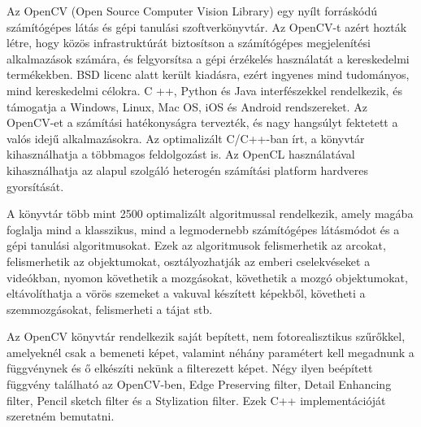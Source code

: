 


Az OpenCV (Open Source Computer Vision Library) egy nyílt forráskódú számítógépes látás és gépi tanulási szoftverkönyvtár. Az OpenCV-t azért hozták létre, hogy közös infrastruktúrát biztosítson a számítógépes megjelenítési alkalmazások számára, és felgyorsítsa a gépi érzékelés használatát a kereskedelmi termékekben. BSD licenc alatt került kiadásra, ezért ingyenes mind tudományos, mind kereskedelmi célokra. C ++, Python és Java interfészekkel rendelkezik, és támogatja a Windows, Linux, Mac OS, iOS és Android rendszereket. Az OpenCV-et a számítási hatékonyságra tervezték, és nagy hangsúlyt fektetett a valós idejű alkalmazásokra. Az optimalizált C/C++-ban írt, a könyvtár kihasználhatja a többmagos feldolgozást is. Az OpenCL használatával kihasználhatja az alapul szolgáló heterogén számítási platform hardveres gyorsítását.

A könyvtár több mint 2500 optimalizált algoritmussal rendelkezik, amely magába foglalja mind a klasszikus, mind a legmodernebb számítógépes látásmódot és a gépi tanulási algoritmusokat. Ezek az algoritmusok felismerhetik az arcokat, felismerhetik az objektumokat, osztályozhatják az emberi cselekvéseket a videókban, nyomon követhetik a mozgásokat, követhetik a mozgó objektumokat, eltávolíthatja a vörös szemeket a vakuval készített képekből, követheti a szemmozgásokat, felismerheti a tájat stb. 



Az OpenCV könyvtár rendelkezik saját bepített, nem fotorealisztikus szűrőkkel, amelyeknél csak a bemeneti képet, valamint néhány paramétert kell megadnunk a függvénynek és ő elkészíti nekünk a filterezett képet. Négy ilyen beépített függvény található az OpenCV-ben, Edge Preserving filter, Detail Enhancing filter, Pencil sketch filter és a Stylization filter. Ezek C++ implementációját szeretném bemutatni.


